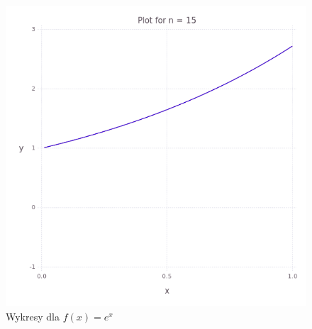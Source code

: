 \begin{figure}
\begin{multicols}{2}
    \end{multicols}
    \begin{multicols}{2}
        \includegraphics[width=\linewidth]{../task-5/plots/myplot-ex-15.png}\par 
    \end{multicols}
    \caption{Wykresy dla $f(x) = e^x$}    
\end{figure}

